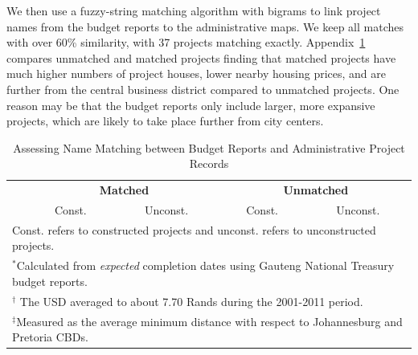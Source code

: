 \documentclass[12pt]{article}
\begin{document}
We then use a fuzzy-string matching algorithm with bigrams to link project names from the budget reports to the administrative maps.  We keep all matches with over 60\% similarity, with 37 projects matching exactly.  Appendix~\ref{table:stringmatch} compares unmatched and matched projects finding that matched projects have much higher numbers of project houses, lower nearby housing prices, and are further from the central business district compared to unmatched projects.  One reason may be that the budget reports only include larger, more expansive projects, which are likely to take place further from city centers. 


\vspace{0mm}
\begin{table}[ht!]
\centering
\caption{Assessing Name Matching between Budget Reports and Administrative Project Records}\label{table:stringmatch}
\vspace{0mm}
\begin{tabular}{l*{1}{cccc}}
\toprule
  & \multicolumn{2}{c}{\textbf{Matched}}& \multicolumn{2}{c}{\textbf{Unmatched}}    \\
  &Const. & Unconst. &Const. & Unconst.  \\
\midrule

\bottomrule
\multicolumn{5}{l}{\scriptsize Const. refers to constructed projects and unconst. refers to unconstructed projects.}\\[-.5em]
\multicolumn{5}{l}{\scriptsize $^*$Calculated from {\it expected} completion dates using Gauteng National Treasury budget reports.}\\[-.5em]
\multicolumn{5}{l}{\scriptsize $^\dagger$ The USD averaged to about 7.70 Rands during the 2001-2011 period.}\\[-.5em]
\multicolumn{5}{l}{\scriptsize $^\ddagger$Measured as the average minimum distance with respect to Johannesburg and Pretoria CBDs. } \\[-.5em]
\end{tabular}
\end{table} 
\end{document}

